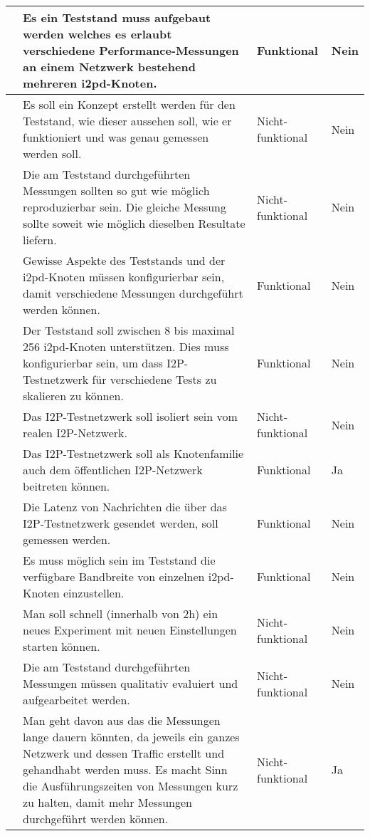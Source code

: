 \begin{longtable}{N p{8.5cm} l l}
      & Es ein Teststand muss aufgebaut werden welches es erlaubt verschiedene Performance-Messungen
                  an einem Netzwerk bestehend mehreren i2pd-Knoten. & Funktional & Nein \\ \midrule
      & Es soll ein Konzept erstellt werden für den Teststand, wie dieser aussehen soll, wie er funktioniert und was genau gemessen werden soll. & Nicht-funktional & Nein \\ \midrule
      & Die am Teststand durchgeführten Messungen sollten so gut wie möglich reproduzierbar sein. Die gleiche Messung sollte soweit wie möglich dieselben Resultate liefern. & Nicht-funktional & Nein \\ \midrule
      & Gewisse Aspekte des Teststands und der i2pd-Knoten müssen konfigurierbar sein, damit verschiedene Messungen durchgeführt werden können.  & Funktional & Nein \\ \midrule
      & Der Teststand soll zwischen 8 bis maximal 256 i2pd-Knoten unterstützen. Dies muss konfigurierbar sein, um dass I2P-Testnetzwerk für verschiedene Tests zu skalieren zu können. & Funktional & Nein \\ \midrule
      & Das I2P-Testnetzwerk soll isoliert sein vom realen I2P-Netzwerk. & Nicht-funktional & Nein \\ \midrule
      & Das I2P-Testnetzwerk soll als Knotenfamilie auch dem öffentlichen I2P-Netzwerk beitreten können. & Funktional & Ja \\ \midrule
      & Die Latenz von Nachrichten die über das I2P-Testnetzwerk gesendet werden, soll gemessen werden. & Funktional & Nein \\ \midrule
      & Es muss möglich sein im Teststand die verfügbare Bandbreite von einzelnen i2pd-Knoten einzustellen. & Funktional & Nein \\ \midrule
      & Man soll schnell (innerhalb von 2h) ein neues Experiment mit neuen Einstellungen starten können. & Nicht-funktional & Nein \\ \midrule
      & Die am Teststand durchgeführten Messungen müssen qualitativ evaluiert und aufgearbeitet werden.  & Nicht-funktional & Nein \\ \midrule
      & Man geht davon aus das die Messungen lange dauern könnten, da jeweils ein ganzes Netzwerk und dessen Traffic erstellt und gehandhabt werden muss. Es macht Sinn die Ausführungszeiten von Messungen kurz zu halten, damit mehr Messungen durchgeführt werden können. & Nicht-funktional & Ja \\ \midrule

\end{longtable}
